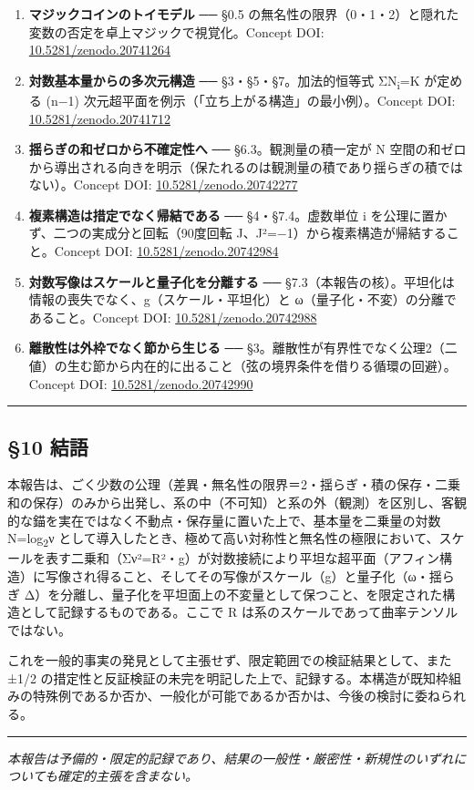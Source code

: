 \documentclass[11pt]{ltjsarticle}
\providecommand{\tightlist}{\setlength{\itemsep}{0pt}\setlength{\parskip}{0pt}}
\begin{document}
\begin{enumerate}
\def\labelenumi{\arabic{enumi}.}
\tightlist
\item
  \textbf{マジックコインのトイモデル} ── §0.5
  の無名性の限界（0・1・2）と隠れた変数の否定を卓上マジックで視覚化。Concept
  DOI:
  \href{https://doi.org/10.5281/zenodo.20741264}{10.5281/zenodo.20741264}
\item
  \textbf{対数基本量からの多次元構造} ── §3・§5・§7。加法的恒等式 ΣN\textsubscript{i}=K
  が定める (n−1) 次元超平面を例示（「立ち上がる構造」の最小例）。Concept
  DOI:
  \href{https://doi.org/10.5281/zenodo.20741712}{10.5281/zenodo.20741712}
\item
  \textbf{揺らぎの和ゼロから不確定性へ} ── §6.3。観測量の積一定が N
  空間の和ゼロから導出される向きを明示（保たれるのは観測量の積であり揺らぎの積ではない）。Concept
  DOI:
  \href{https://doi.org/10.5281/zenodo.20742277}{10.5281/zenodo.20742277}
\item
  \textbf{複素構造は措定でなく帰結である} ── §4・§7.4。虚数単位 i
  を公理に置かず、二つの実成分と回転（90度回転
  J、J²=−1）から複素構造が帰結すること。Concept DOI:
  \href{https://doi.org/10.5281/zenodo.20742984}{10.5281/zenodo.20742984}
\item
  \textbf{対数写像はスケールと量子化を分離する} ──
  §7.3（本報告の核）。平坦化は情報の喪失でなく、g（スケール・平坦化）と
  ω（量子化・不変）の分離であること。Concept DOI:
  \href{https://doi.org/10.5281/zenodo.20742988}{10.5281/zenodo.20742988}
\item
  \textbf{離散性は外枠でなく節から生じる} ──
  §3。離散性が有界性でなく公理2（二値）の生む節から内在的に出ること（弦の境界条件を借りる循環の回避）。Concept
  DOI:
  \href{https://doi.org/10.5281/zenodo.20742990}{10.5281/zenodo.20742990}
\end{enumerate}

\begin{center}\rule{0.5\linewidth}{0.5pt}\end{center}

\subsection{§10 結語}\label{ux7d50ux8a9e}

本報告は、ごく少数の公理（差異・無名性の限界＝2・揺らぎ・積の保存・二乗和の保存）のみから出発し、系の中（不可知）と系の外（観測）を区別し、客観的な錨を実在ではなく不動点・保存量に置いた上で、基本量を二乗量の対数
N=log\textsubscript{2}ν
として導入したとき、極めて高い対称性と無名性の極限において、スケールを表す二乗和（Σν²=R²・g）が対数接続により平坦な超平面（アフィン構造）に写像され得ること、そしてその写像がスケール（g）と量子化（ω・揺らぎ
Δ）を分離し、量子化を平坦面上の不変量として保つこと、を限定された構造として記録するものである。ここで
R は系のスケールであって曲率テンソルではない。

これを一般的事実の発見として主張せず、限定範囲での検証結果として、また
±1/2
の措定性と反証検証の未完を明記した上で、記録する。本構造が既知枠組みの特殊例であるか否か、一般化が可能であるか否かは、今後の検討に委ねられる。

\begin{center}\rule{0.5\linewidth}{0.5pt}\end{center}

\emph{本報告は予備的・限定的記録であり、結果の一般性・厳密性・新規性のいずれについても確定的主張を含まない。}
\end{document}
